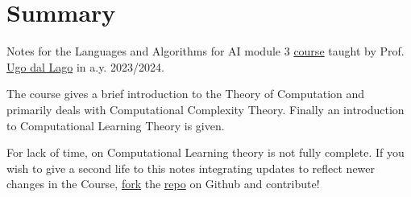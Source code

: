 \chapter*{Summary}
\label{ch:summary}

\vspace*{-1cm}
Notes for the Languages and Algorithms for AI module 3 \href{https://www.unibo.it/en/study/phd-professional-masters-specialisation-schools-and-other-programmes/course-unit-catalogue/course-unit/2023/446595}{course} taught by Prof. \href{https://www.unibo.it/sitoweb/ugo.dallago/en}{Ugo dal Lago} in a.y. 2023/2024.

\bigskip
The course gives a brief introduction to the Theory of Computation and primarily deals with Computational Complexity Theory. Finally an introduction to Computational Learning Theory is given.

\bigskip
For lack of time, \chapref{\ref{ch:computational-learning}} on Computational Learning theory is not fully complete.
If you wish to give a second life to this notes integrating updates to reflect newer changes in the Course, \href{https://github.com/niccolozanotti/laai3/fork}{fork} the \href{https://github.com/niccolozanotti/laai3}{repo} on Github and contribute!
